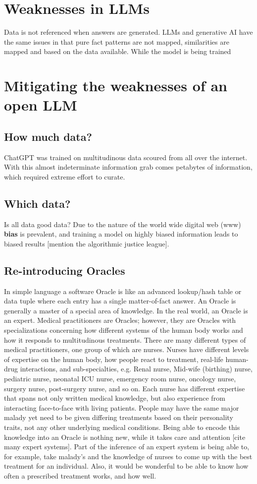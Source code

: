 \section{Weaknesses in LLMs}
Data is not referenced when answers are generated.
LLMs and generative AI have the same issues in that pure fact patterns are not mapped, similarities are mapped and based on the data available.
While the model is being trained

\section{Mitigating the weaknesses of an open LLM}
\subsection{How much data?}
ChatGPT was trained on multitudinous data scoured from all over the internet. 
With this almost indeterminate information grab comes petabytes of information, which required extreme effort to curate.
\subsection{Which data?}
Is all data good data?
Due to the nature of the world wide digital web (www) \textbf{bias} is prevalent, and training a model on highly biased information leads to biased results [mention the algorithmic justice league].
\subsection{Re-introducing Oracles}
In simple language a software Oracle is like an advanced lookup/hash table or data tuple where each entry has a single matter-of-fact answer.
An Oracle is generally a master of a special area of knowledge.
In the real world, an Oracle is an expert.
Medical practitioners are Oracles; however, they are Oracles with specializations concerning how different systems of the human body works and how it responds to multitudinous treatments.
There are many different types of medical practitioners, one group of which are nurses.
Nurses have different levels of expertise on the human body, how people react to treatment, real-life human-drug interactions, and sub-specialties, e.g. Renal nurse, Mid-wife (birthing) nurse, pediatric nurse, neonatal ICU nurse, emergency room nurse, oncology nurse, surgery nurse, post-surgery nurse, and so on.
Each nurse has different expertise that spans not only written medical knowledge, but also experience from interacting face-to-face with living patients.
People may have the same major malady yet need to be given differing treatments based on their personality traits, not any other underlying medical conditions.
Being able to encode this knowledge into an Oracle is nothing new, while it takes care and attention [cite many expert systems].
Part of the inference of an expert system is being able to, for example, take malady's and the knowledge of nurses to come up with the best treatment for an individual.
Also, it would be wonderful to be able to know how often a prescribed treatment works, and how well.

